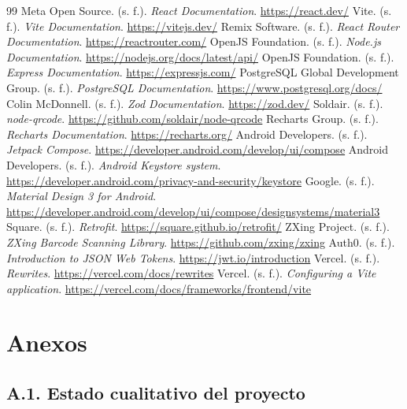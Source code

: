 \documentclass[12pt,a4paper,oneside]{report}
\begin{document}
\begin{thebibliography}{99}
   Meta Open Source. (s. f.). \emph{React Documentation}. \url{https://react.dev/}
   Vite. (s. f.). \emph{Vite Documentation}. \url{https://vitejs.dev/}
   Remix Software. (s. f.). \emph{React Router Documentation}. \url{https://reactrouter.com/}
   OpenJS Foundation. (s. f.). \emph{Node.js Documentation}. \url{https://nodejs.org/docs/latest/api/}
   OpenJS Foundation. (s. f.). \emph{Express Documentation}. \url{https://expressjs.com/}
   PostgreSQL Global Development Group. (s. f.). \emph{PostgreSQL Documentation}. \url{https://www.postgresql.org/docs/}
   Colin McDonnell. (s. f.). \emph{Zod Documentation}. \url{https://zod.dev/}
   Soldair. (s. f.). \emph{node-qrcode}. \url{https://github.com/soldair/node-qrcode}
   Recharts Group. (s. f.). \emph{Recharts Documentation}. \url{https://recharts.org/}
   Android Developers. (s. f.). \emph{Jetpack Compose}. \url{https://developer.android.com/develop/ui/compose}
   Android Developers. (s. f.). \emph{Android Keystore system}. \url{https://developer.android.com/privacy-and-security/keystore}
   Google. (s. f.). \emph{Material Design 3 for Android}. \url{https://developer.android.com/develop/ui/compose/designsystems/material3}
   Square. (s. f.). \emph{Retrofit}. \url{https://square.github.io/retrofit/}
   ZXing Project. (s. f.). \emph{ZXing Barcode Scanning Library}. \url{https://github.com/zxing/zxing}
   Auth0. (s. f.). \emph{Introduction to JSON Web Tokens}. \url{https://jwt.io/introduction}
   Vercel. (s. f.). \emph{Rewrites}. \url{https://vercel.com/docs/rewrites}
   Vercel. (s. f.). \emph{Configuring a Vite application}. \url{https://vercel.com/docs/frameworks/frontend/vite}
\end{thebibliography}

\chapter*{Anexos}

\section*{A.1. Estado cualitativo del proyecto}
\end{document}
